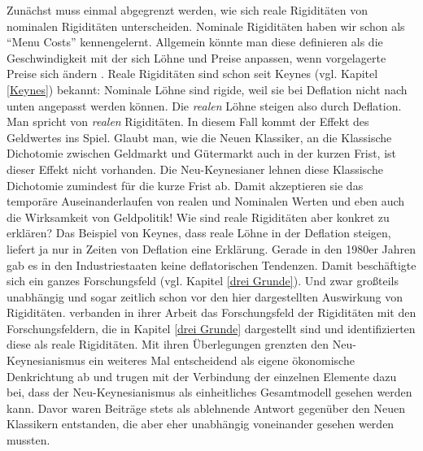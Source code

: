 Zunächst muss einmal abgegrenzt werden, wie sich reale Rigiditäten von nominalen Rigiditäten unterscheiden. Nominale Rigiditäten haben wir schon als "`Menu Costs"' kennengelernt. Allgemein könnte man diese definieren als die Geschwindigkeit mit der sich Löhne und Preise anpassen, wenn vorgelagerte Preise sich ändern \parencite[S. 270]{Blanchard2003}. Reale Rigiditäten sind schon seit Keynes (vgl. Kapitel \ref{Keynes}) bekannt: Nominale Löhne sind rigide, weil sie bei Deflation nicht nach unten angepasst werden können. Die \textit{realen} Löhne steigen also durch Deflation. Man spricht von \textit{realen} Rigiditäten. In diesem Fall kommt der Effekt des Geldwertes ins Spiel. Glaubt man, wie die Neuen Klassiker, an die Klassische Dichotomie zwischen Geldmarkt und Gütermarkt auch in der kurzen Frist, ist dieser Effekt nicht vorhanden. Die Neu-Keynesianer lehnen diese Klassische Dichotomie zumindest für die kurze Frist ab. Damit akzeptieren sie das temporäre Auseinanderlaufen von realen und Nominalen Werten und eben auch die Wirksamkeit von Geldpolitik! Wie sind reale Rigiditäten aber konkret zu erklären? Das Beispiel von Keynes, dass reale Löhne in der Deflation steigen, liefert ja nur in Zeiten von Deflation eine Erklärung. Gerade in den 1980er Jahren gab es in den Industriestaaten keine deflatorischen Tendenzen. Damit beschäftigte sich ein ganzes Forschungsfeld (vgl. Kapitel \ref{drei Grunde}). Und zwar großteils unabhängig und sogar zeitlich schon vor den hier dargestellten Auswirkung von Rigiditäten. \textcite{RomerDavid1990} verbanden in ihrer Arbeit das Forschungsfeld der Rigiditäten mit den Forschungsfeldern, die in Kapitel \ref{drei Grunde} dargestellt sind und identifizierten diese als reale Rigiditäten. Mit ihren Überlegungen grenzten \textcite{RomerDavid1990} den Neu-Keynesianismus ein weiteres Mal entscheidend als eigene ökonomische Denkrichtung ab und trugen mit der Verbindung der einzelnen Elemente dazu bei, dass der Neu-Keynesianismus als einheitliches Gesamtmodell gesehen werden kann. Davor waren Beiträge stets als ablehnende Antwort gegenüber den Neuen Klassikern entstanden, die aber eher unabhängig voneinander gesehen werden mussten.

